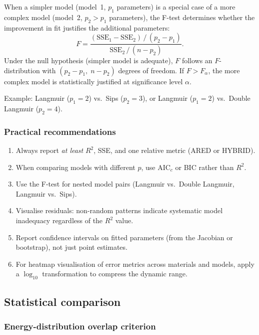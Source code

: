 \documentclass[12pt]{article}
\begin{document}
	When a simpler model (model~1, $p_1$ parameters) is a special case
	of a more complex model (model~2, $p_2 > p_1$ parameters), the
	F-test determines whether the improvement in fit justifies the
	additional parameters:
	\begin{equation}
		F = \frac{(\mathrm{SSE}_1 - \mathrm{SSE}_2)\,/\,
			(p_2 - p_1)}
		{\mathrm{SSE}_2\,/\,(n - p_2)}.
		\label{eq:Ftest}
	\end{equation}
	Under the null hypothesis (simpler model is adequate), $F$ follows
	an $F$-distribution with $(p_2 - p_1,\; n - p_2)$ degrees of
	freedom. If $F > F_{\alpha}$, the more complex model is
	statistically justified at significance level $\alpha$.

	Example: Langmuir ($p_1 = 2$) vs.\ Sips ($p_2 = 3$), or
	Langmuir ($p_1 = 2$) vs.\ Double Langmuir ($p_2 = 4$).

	\subsubsection{Practical recommendations}

	\begin{enumerate}
		\item Always report \emph{at least} $R^{2}$, SSE, and one
		relative metric (ARED or HYBRID).
		\item When comparing models with different $p$, use AIC$_c$
		or BIC rather than $R^{2}$.
		\item Use the F-test for nested model pairs
		(Langmuir vs.\ Double Langmuir, Langmuir vs.\ Sips).
		\item Visualise residuals: non-random patterns indicate
		systematic model inadequacy regardless of the $R^{2}$ value.
		\item Report confidence intervals on fitted parameters
		(from the Jacobian or bootstrap), not just point estimates.
		\item For heatmap visualisation of error metrics across
		materials and models, apply a $\log_{10}$ transformation to
		compress the dynamic range.
	\end{enumerate}

	\subsection{Statistical comparison}
	\subsubsection{Energy-distribution overlap criterion}
\end{document}
